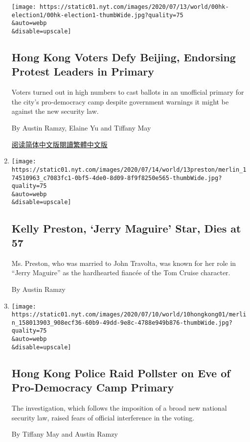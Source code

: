 \begin{enumerate}
  \texttt{[image: https://static01.nyt.com/images/2020/07/13/world/00hk-election1/00hk-election1-thumbWide.jpg?quality=75\\\&auto=webp\\\&disable=upscale]}

  \hypertarget{hong-kong-voters-defy-beijing-endorsing-protest-leaders-in-primary}{%
  \subsection{Hong Kong Voters Defy Beijing, Endorsing Protest Leaders
  in
  Primary}\label{hong-kong-voters-defy-beijing-endorsing-protest-leaders-in-primary}}

  Voters turned out in high numbers to cast ballots in an unofficial
  primary for the city's pro-democracy camp despite government warnings
  it might be against the new security law.

  By Austin Ramzy, Elaine Yu and Tiffany May

  \href{https://cn.nytimes.com/china/20200714/hong-kong-elections-security/}{阅读简体中文版}\href{https://cn.nytimes.com/china/20200714/hong-kong-elections-security/zh-hant/}{閱讀繁體中文版}
\item
  \href{/2020/07/13/movies/kelly-preston-dead.html}{}

  \texttt{[image: https://static01.nyt.com/images/2020/07/14/world/13preston/merlin\_174510963\_c7083fc1-0bf5-4de0-8d09-8f9f8250e565-thumbWide.jpg?quality=75\\\&auto=webp\\\&disable=upscale]}

  \hypertarget{kelly-preston-jerry-maguire-star-dies-at-57}{%
  \subsection{Kelly Preston, `Jerry Maguire' Star, Dies at
  57}\label{kelly-preston-jerry-maguire-star-dies-at-57}}

  Ms. Preston, who was married to John Travolta, was known for her role
  in ``Jerry Maguire'' as the hardhearted fiancée of the Tom Cruise
  character.

  By Austin Ramzy
\item
  \href{/2020/07/10/world/asia/hong-kong-police-raid-pollster.html}{}

  \texttt{[image: https://static01.nyt.com/images/2020/07/10/world/10hongkong01/merlin\_158013903\_908ecf36-60b9-49dd-9e8c-4788e949b876-thumbWide.jpg?quality=75\\\&auto=webp\\\&disable=upscale]}

  \hypertarget{hong-kong-police-raid-pollster-on-eve-of-pro-democracy-camp-primary}{%
  \subsection{Hong Kong Police Raid Pollster on Eve of Pro-Democracy
  Camp
  Primary}\label{hong-kong-police-raid-pollster-on-eve-of-pro-democracy-camp-primary}}

  The investigation, which follows the imposition of a broad new
  national security law, raised fears of official interference in the
  voting.

  By Tiffany May and Austin Ramzy
\end{enumerate}


